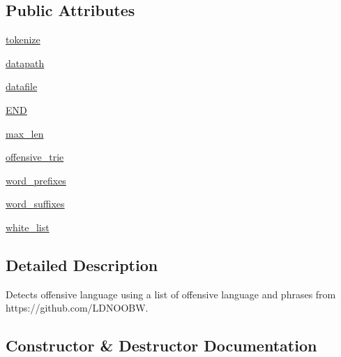 \subsection*{Public Attributes}
\begin{DoxyCompactItemize}
\item 
\hyperlink{classparlai_1_1utils_1_1safety_1_1OffensiveStringMatcher_a6c9ecda500832f159ede21f3a73ee56b}{tokenize}
\item 
\hyperlink{classparlai_1_1utils_1_1safety_1_1OffensiveStringMatcher_a8c7a5276c0d2ed281a19bbcbcee3b8af}{datapath}
\item 
\hyperlink{classparlai_1_1utils_1_1safety_1_1OffensiveStringMatcher_a47317e09499753db2a16fc36fd39de90}{datafile}
\item 
\hyperlink{classparlai_1_1utils_1_1safety_1_1OffensiveStringMatcher_a50a8ff283ddb837060366bba52d8136c}{E\+ND}
\item 
\hyperlink{classparlai_1_1utils_1_1safety_1_1OffensiveStringMatcher_a3be92b9eb75dc4e4939010af668e724f}{max\+\_\+len}
\item 
\hyperlink{classparlai_1_1utils_1_1safety_1_1OffensiveStringMatcher_a4fe018f2abe2a73114d783645c006c1b}{offensive\+\_\+trie}
\item 
\hyperlink{classparlai_1_1utils_1_1safety_1_1OffensiveStringMatcher_aa880cf00a0354c45f576c3d933a1435e}{word\+\_\+prefixes}
\item 
\hyperlink{classparlai_1_1utils_1_1safety_1_1OffensiveStringMatcher_af474171a03d288a3d8adaa2287eedc8c}{word\+\_\+suffixes}
\item 
\hyperlink{classparlai_1_1utils_1_1safety_1_1OffensiveStringMatcher_a65169673f0ff35c5e1f0258585540389}{white\+\_\+list}
\end{DoxyCompactItemize}


\subsection{Detailed Description}
\begin{DoxyVerb}Detects offensive language using a list of offensive language and phrases from
https://github.com/LDNOOBW.
\end{DoxyVerb}
 

\subsection{Constructor \& Destructor Documentation}
\mbox{\label{classparlai_1_1utils_1_1safety_1_1OffensiveStringMatcher_a9e850e121799468d26c5720be21bf72c}} 
